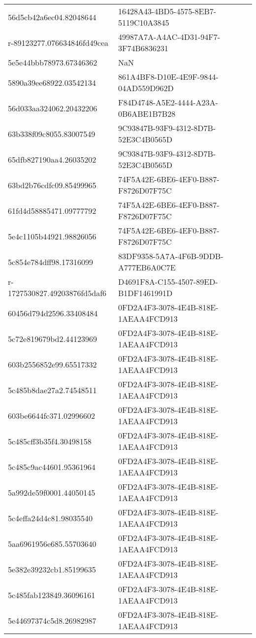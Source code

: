 \begin{tabular}{ll}
56d5cb42a6ec04.82048644 & 16428A43-4BD5-4575-8EB7-5119C10A3845 \\
r-89123277.076634846fd49cea & 49987A7A-A4AC-4D31-94F7-3F74B6836231 \\
5e5e44bbb78973.67346362 & NaN \\
5890a39ee68922.03542134 & 861A4BF8-D10E-4E9F-9844-04AD559D962D \\
56d033aa324062.20432206 & F84D4748-A5E2-4444-A23A-0B6ABE1B7B28 \\
63b338f09c8055.83007549 & 9C93847B-93F9-4312-8D7B-52E3C4B0565D \\
65dfb827190aa4.26035202 & 9C93847B-93F9-4312-8D7B-52E3C4B0565D \\
63bd2b76cdfc09.85499965 & 74F5A42E-6BE6-4EF0-B887-F8726D07F75C \\
61fd4d58885471.09777792 & 74F5A42E-6BE6-4EF0-B887-F8726D07F75C \\
5e4c1105b44921.98826056 & 74F5A42E-6BE6-4EF0-B887-F8726D07F75C \\
5c854e784dff98.17316099 & 83DF9358-5A7A-4F6B-9DDB-A777EB6A0C7E \\
r-1727530827.49203876fd5daf6 & D4691F8A-C155-4507-89ED-B1DF1461991D \\
60456d794d2596.33408484 & 0FD2A4F3-3078-4E4B-818E-1AEAA4FCD913 \\
5c72e819679bd2.44123969 & 0FD2A4F3-3078-4E4B-818E-1AEAA4FCD913 \\
603b2556852e99.65517332 & 0FD2A4F3-3078-4E4B-818E-1AEAA4FCD913 \\
5c485b8dae27a2.74548511 & 0FD2A4F3-3078-4E4B-818E-1AEAA4FCD913 \\
603be6644fc371.02996602 & 0FD2A4F3-3078-4E4B-818E-1AEAA4FCD913 \\
5c485cff3b35f4.30498158 & 0FD2A4F3-3078-4E4B-818E-1AEAA4FCD913 \\
5c485c9ac44601.95361964 & 0FD2A4F3-3078-4E4B-818E-1AEAA4FCD913 \\
5a992de59f0001.44050145 & 0FD2A4F3-3078-4E4B-818E-1AEAA4FCD913 \\
5c4effa24d4c81.98035540 & 0FD2A4F3-3078-4E4B-818E-1AEAA4FCD913 \\
5aa6961956e685.55703640 & 0FD2A4F3-3078-4E4B-818E-1AEAA4FCD913 \\
5e382e39232cb1.85199635 & 0FD2A4F3-3078-4E4B-818E-1AEAA4FCD913 \\
5c485fab123849.36096161 & 0FD2A4F3-3078-4E4B-818E-1AEAA4FCD913 \\
5e44697374c5d8.26982987 & 0FD2A4F3-3078-4E4B-818E-1AEAA4FCD913 \\

\end{tabular}
